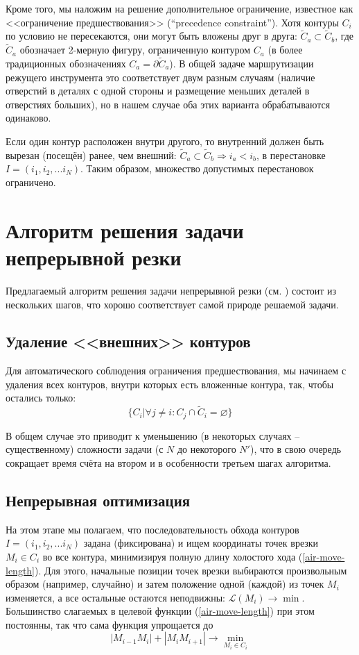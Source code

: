 \documentclass[14pt]{extarticle}
\theoremstyle{plain}%
\theoremstyle{definition}
\theoremstyle{remark}
\begin{document}
Кроме того,
мы наложим на решение дополнительное ограничение,
известное как
<<ограничение предшествования>>
(``precedence constraint'').
Хотя контуры
$C_i$
по условию не пересекаются,
они могут быть вложены друг в друга:
\( \tilde C_a \subset \tilde C_b \),
где
$\tilde C_a$
обозначает 2-мерную фигуру,
ограниченную контуром
$C_a$
(в более традиционных обозначениях
$C_a = \partial \tilde C_a$).
В общей задаче маршрутизации
режущего инструмента это
соответствует двум разным случаям
(наличие отверстий в деталях с одной стороны
и размещение меньших деталей в отверстиях больших),
но в нашем случае оба этих
варианта обрабатываются одинаково.

Если один контур расположен внутри другого,
то внутренний должен быть вырезан
(посещён)
ранее, чем внешний:
\( \tilde C_a \subset \tilde C_b \Rightarrow i_a < i_b \),
в перестановке
$I = (i_1, i_2, ... i_N)$.
Таким образом,
множество допустимых перестановок ограничено.

\section{Алгоритм решения задачи непрерывной резки}

Предлагаемый алгоритм решения задачи непрерывной резки
(см. \cite{berlin2019})
состоит из нескольких шагов,
что хорошо соответствует самой природе
решаемой задачи.

\subsection{Удаление <<внешних>> контуров}

Для автоматического соблюдения
ограничения предшествования,
мы начинаем с удаления всех контуров,
внутри которых есть вложенные контура,
так, чтобы остались только:
$$
\{C_i | \forall j \ne i: C_j \cap \tilde C_i = \varnothing \}
$$

В общем случае это приводит к уменьшению
(в некоторых случаях -- существенному)
сложности задачи
(с $N$ до некоторого $N'$),
что в свою очередь
сокращает время счёта
на втором и в особенности третьем
шагах алгоритма.

\subsection{Непрерывная оптимизация}

На этом этапе мы полагаем,
что последовательность обхода контуров
$I = (i_1, i_2, ... i_N)$
задана (фиксирована)
и ищем координаты точек врезки
$M_i \in C_i$
во все контура,
минимизируя полную длину холостого хода
(\ref{air-move-length}).
Для этого,
начальные позиции точек врезки выбираются
произвольным образом
(например, случайно)
и затем положение одной (каждой) из точек
$M_i$
изменяется, а все остальные остаются неподвижны:
$\mathcal{L}(M_i) \to \min$.
Большинство слагаемых в целевой функции
(\ref{air-move-length})
при этом постоянны,
так что сама функция упрощается до
$$
|M_{i-1}M_i|+|M_iM_{i+1}| \to \min_{M_i \in C_i}
$$
\end{document}
